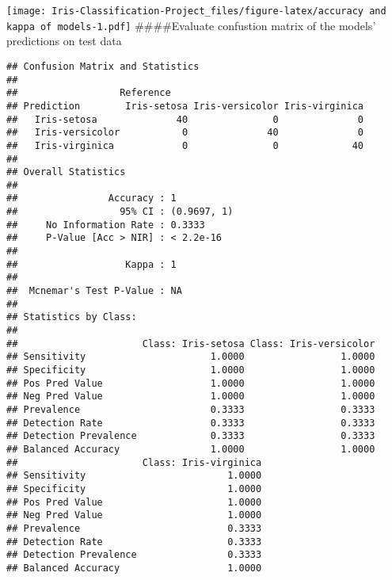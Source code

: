 \documentclass[]{article}
\newenvironment{Shaded}{\begin{snugshade}}{\end{snugshade}}
\newcommand{\KeywordTok}[1]{\textcolor[rgb]{0.13,0.29,0.53}{\textbf{#1}}}
\newcommand{\OperatorTok}[1]{\textcolor[rgb]{0.81,0.36,0.00}{\textbf{#1}}}
\newcommand{\NormalTok}[1]{#1}
\begin{document}
\texttt{[image: Iris-Classification-Project\_files/figure-latex/accuracy and kappa of models-1.pdf]}
\#\#\#\#Evaluate confustion matrix of the models' predictions on test
data

\begin{Shaded}
\end{Shaded}

\begin{verbatim}
## Confusion Matrix and Statistics
## 
##                  Reference
## Prediction        Iris-setosa Iris-versicolor Iris-virginica
##   Iris-setosa              40               0              0
##   Iris-versicolor           0              40              0
##   Iris-virginica            0               0             40
## 
## Overall Statistics
##                                      
##                Accuracy : 1          
##                  95% CI : (0.9697, 1)
##     No Information Rate : 0.3333     
##     P-Value [Acc > NIR] : < 2.2e-16  
##                                      
##                   Kappa : 1          
##                                      
##  Mcnemar's Test P-Value : NA         
## 
## Statistics by Class:
## 
##                      Class: Iris-setosa Class: Iris-versicolor
## Sensitivity                      1.0000                 1.0000
## Specificity                      1.0000                 1.0000
## Pos Pred Value                   1.0000                 1.0000
## Neg Pred Value                   1.0000                 1.0000
## Prevalence                       0.3333                 0.3333
## Detection Rate                   0.3333                 0.3333
## Detection Prevalence             0.3333                 0.3333
## Balanced Accuracy                1.0000                 1.0000
##                      Class: Iris-virginica
## Sensitivity                         1.0000
## Specificity                         1.0000
## Pos Pred Value                      1.0000
## Neg Pred Value                      1.0000
## Prevalence                          0.3333
## Detection Rate                      0.3333
## Detection Prevalence                0.3333
## Balanced Accuracy                   1.0000
\end{verbatim}

\begin{Shaded}
\end{Shaded}
\end{document}
